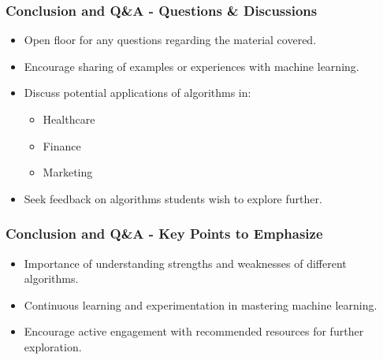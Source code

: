 \documentclass[aspectratio=169]{beamer}
\begin{document}
\begin{frame}[fragile]
  \frametitle{Conclusion and Q\&A - Questions \& Discussions}
  
  \begin{itemize}
    \item Open floor for any questions regarding the material covered.
    \item Encourage sharing of examples or experiences with machine learning.
    \item Discuss potential applications of algorithms in:
    \begin{itemize}
      \item Healthcare
      \item Finance
      \item Marketing
    \end{itemize}
    \item Seek feedback on algorithms students wish to explore further.
  \end{itemize}
\end{frame}

\begin{frame}[fragile]
  \frametitle{Conclusion and Q\&A - Key Points to Emphasize}

  \begin{itemize}
    \item Importance of understanding strengths and weaknesses of different algorithms.
    \item Continuous learning and experimentation in mastering machine learning.
    \item Encourage active engagement with recommended resources for further exploration.
  \end{itemize}
\end{frame}
\end{document}
